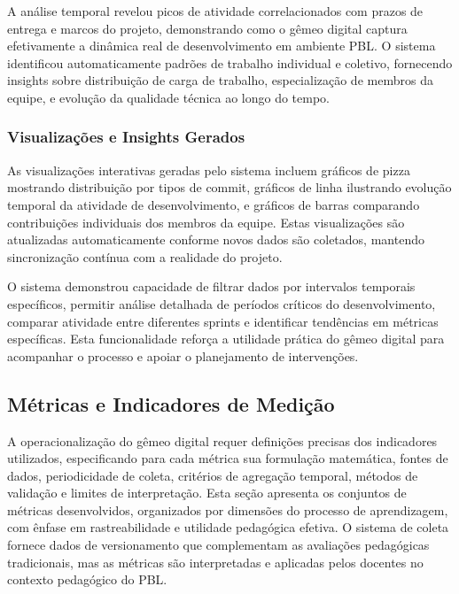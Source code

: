 \documentclass[12pt,a4paper]{article}
\begin{document}
A análise temporal revelou picos de atividade correlacionados com prazos de entrega e marcos do projeto, demonstrando como o gêmeo digital captura efetivamente a dinâmica real de desenvolvimento em ambiente PBL. O sistema identificou automaticamente padrões de trabalho individual e coletivo, fornecendo insights sobre distribuição de carga de trabalho, especialização de membros da equipe, e evolução da qualidade técnica ao longo do tempo.

\subsubsection{Visualizações e Insights Gerados}

As visualizações interativas geradas pelo sistema incluem gráficos de pizza mostrando distribuição por tipos de commit, gráficos de linha ilustrando evolução temporal da atividade de desenvolvimento, e gráficos de barras comparando contribuições individuais dos membros da equipe. Estas visualizações são atualizadas automaticamente conforme novos dados são coletados, mantendo sincronização contínua com a realidade do projeto.

O sistema demonstrou capacidade de filtrar dados por intervalos temporais específicos, permitir análise detalhada de períodos críticos do desenvolvimento, comparar atividade entre diferentes sprints e identificar tendências em métricas específicas. Esta funcionalidade reforça a utilidade prática do gêmeo digital para acompanhar o processo e apoiar o planejamento de intervenções.

\subsection{Métricas e Indicadores de Medição}

A operacionalização do gêmeo digital requer definições precisas dos indicadores utilizados, especificando para cada métrica sua formulação matemática, fontes de dados, periodicidade de coleta, critérios de agregação temporal, métodos de validação e limites de interpretação. Esta seção apresenta os conjuntos de métricas desenvolvidos, organizados por dimensões do processo de aprendizagem, com ênfase em rastreabilidade e utilidade pedagógica efetiva. O sistema de coleta fornece dados de versionamento que complementam as avaliações pedagógicas tradicionais, mas as métricas são interpretadas e aplicadas pelos docentes no contexto pedagógico do PBL.
\end{document}
